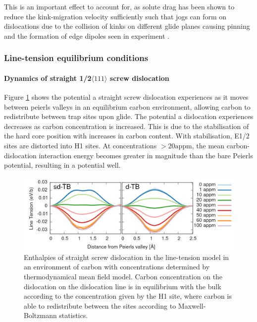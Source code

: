\documentclass[a4paper,11pt]{article}
\numberwithin{equation}{chapter}
\numberwithin{listing}{chapter}
\begin{document}
This is an important effect to account for, as solute drag has been shown to reduce
the kink-migration velocity sufficiently such that
jogs can form on dislocations due to the collision of kinks on different glide
planes causing pinning and the formation of edge dipoles seen in experiment \cite{Gong2020,Katzarov2017b}.

\subsubsection{Line-tension equilibrium conditions}
\label{sec:org51a151f}

\paragraph{Dynamics of straight 1/2\(\langle 111 \rangle\) screw dislocation}
\label{sec:org23516df}

Figure \ref{fig:straighttbequib} shows the potential a straight screw
dislocation experiences as it moves between peierls valleys in an
equilibrium carbon environment, allowing carbon to redistribute between trap
sites upon glide. The potential a dislocation experiences decreases as
carbon concentration is increased. This is due to the stabilisation of the
hard core position with increases in carbon content. With stabilisation,
E1/2 sites are distorted into H1 sites. At concentrations \(\gt
    20\text{appm}\), the mean carbon-dislocation interaction energy becomes
greater in magnitude than the bare Peierls potential, resulting in a
potential well.


\begin{figure}[htbp]
\centering
\includegraphics[width=.97\linewidth]{iron/Images/straight_line_enthalpies_equib_both.png}
\caption{Enthalpies of straight screw dislocation in the line-tension model in an environment of carbon with concentrations determined by thermodynamical mean field model. Carbon concentration on the dislocation on the dislocation line is in equilibrium with the bulk according to the concentration given by the H1 site, where carbon is able to redistribute between the sites according to Maxwell-Boltzmann statistics. \label{fig:straighttbequib}}
\end{figure}
\end{document}
